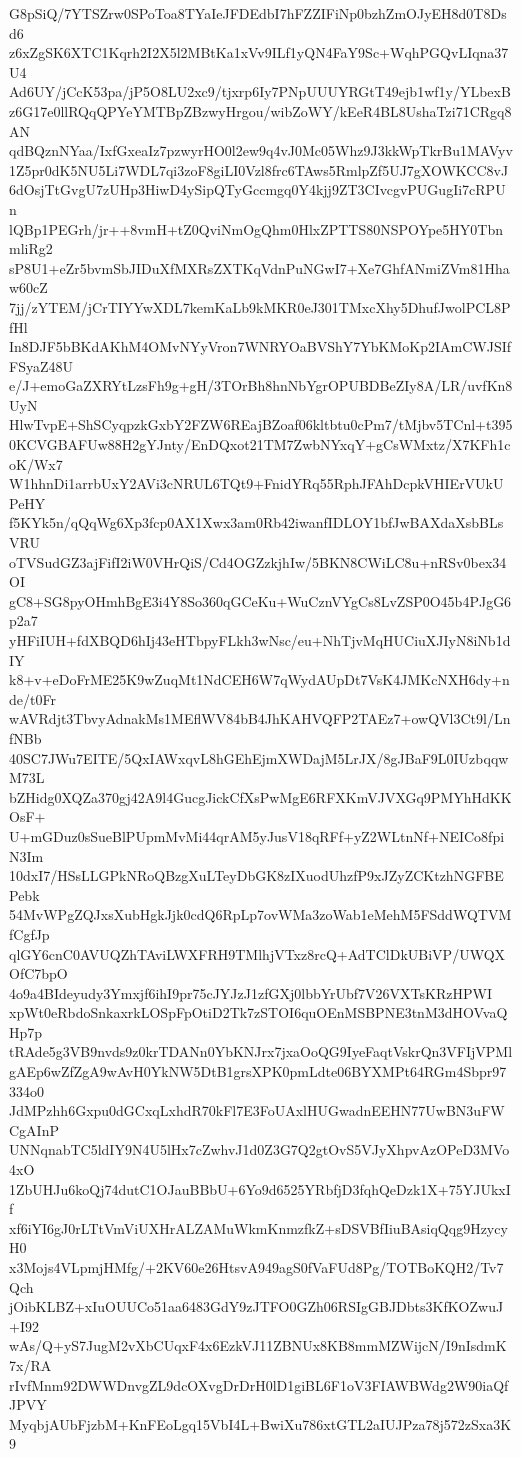 G8pSiQ/7YTSZrw0SPoToa8TYaIeJFDEdbI7hFZZIFiNp0bzhZmOJyEH8d0T8Dsd6
z6xZgSK6XTC1Kqrh2I2X5l2MBtKa1xVv9ILf1yQN4FaY9Sc+WqhPGQvLIqna37U4
Ad6UY/jCcK53pa/jP5O8LU2xc9/tjxrp6Iy7PNpUUUYRGtT49ejb1wf1y/YLbexB
z6G17e0llRQqQPYeYMTBpZBzwyHrgou/wibZoWY/kEeR4BL8UshaTzi71CRgq8AN
qdBQznNYaa/IxfGxeaIz7pzwyrHO0l2ew9q4vJ0Mc05Whz9J3kkWpTkrBu1MAVyv
1Z5pr0dK5NU5Li7WDL7qi3zoF8giLI0Vzl8frc6TAws5RmlpZf5UJ7gXOWKCC8vJ
6dOsjTtGvgU7zUHp3HiwD4ySipQTyGccmgq0Y4kjj9ZT3CIvcgvPUGugIi7cRPUn
lQBp1PEGrh/jr++8vmH+tZ0QviNmOgQhm0HlxZPTTS80NSPOYpe5HY0TbnmliRg2
sP8U1+eZr5bvmSbJIDuXfMXRsZXTKqVdnPuNGwI7+Xe7GhfANmiZVm81Hhaw60cZ
7jj/zYTEM/jCrTIYYwXDL7kemKaLb9kMKR0eJ301TMxcXhy5DhufJwolPCL8PfHl
In8DJF5bBKdAKhM4OMvNYyVron7WNRYOaBVShY7YbKMoKp2IAmCWJSIfFSyaZ48U
e/J+emoGaZXRYtLzsFh9g+gH/3TOrBh8hnNbYgrOPUBDBeZIy8A/LR/uvfKn8UyN
HlwTvpE+ShSCyqpzkGxbY2FZW6REajBZoaf06kltbtu0cPm7/tMjbv5TCnl+t395
0KCVGBAFUw88H2gYJnty/EnDQxot21TM7ZwbNYxqY+gCsWMxtz/X7KFh1coK/Wx7
W1hhnDi1arrbUxY2AVi3cNRUL6TQt9+FnidYRq55RphJFAhDcpkVHIErVUkUPeHY
f5KYk5n/qQqWg6Xp3fcp0AX1Xwx3am0Rb42iwanfIDLOY1bfJwBAXdaXsbBLsVRU
oTVSudGZ3ajFifI2iW0VHrQiS/Cd4OGZzkjhIw/5BKN8CWiLC8u+nRSv0bex34OI
gC8+SG8pyOHmhBgE3i4Y8So360qGCeKu+WuCznVYgCs8LvZSP0O45b4PJgG6p2a7
yHFiIUH+fdXBQD6hIj43eHTbpyFLkh3wNsc/eu+NhTjvMqHUCiuXJIyN8iNb1dIY
k8+v+eDoFrME25K9wZuqMt1NdCEH6W7qWydAUpDt7VsK4JMKcNXH6dy+nde/t0Fr
wAVRdjt3TbvyAdnakMs1MEflWV84bB4JhKAHVQFP2TAEz7+owQVl3Ct9l/LnfNBb
40SC7JWu7EITE/5QxIAWxqvL8hGEhEjmXWDajM5LrJX/8gJBaF9L0IUzbqqwM73L
bZHidg0XQZa370gj42A9l4GucgJickCfXsPwMgE6RFXKmVJVXGq9PMYhHdKKOsF+
U+mGDuz0sSueBlPUpmMvMi44qrAM5yJusV18qRFf+yZ2WLtnNf+NEICo8fpiN3Im
10dxI7/HSsLLGPkNRoQBzgXuLTeyDbGK8zIXuodUhzfP9xJZyZCKtzhNGFBEPebk
54MvWPgZQJxsXubHgkJjk0cdQ6RpLp7ovWMa3zoWab1eMehM5FSddWQTVMfCgfJp
qlGY6cnC0AVUQZhTAviLWXFRH9TMlhjVTxz8rcQ+AdTClDkUBiVP/UWQXOfC7bpO
4o9a4BIdeyudy3Ymxjf6ihI9pr75cJYJzJ1zfGXj0lbbYrUbf7V26VXTsKRzHPWI
xpWt0eRbdoSnkaxrkLOSpFpOtiD2Tk7zSTOI6quOEnMSBPNE3tnM3dHOVvaQHp7p
tRAde5g3VB9nvds9z0krTDANn0YbKNJrx7jxaOoQG9IyeFaqtVskrQn3VFIjVPMl
gAEp6wZfZgA9wAvH0YkNW5DtB1grsXPK0pmLdte06BYXMPt64RGm4Sbpr97334o0
JdMPzhh6Gxpu0dGCxqLxhdR70kFl7E3FoUAxlHUGwadnEEHN77UwBN3uFWCgAInP
UNNqnabTC5ldIY9N4U5lHx7cZwhvJ1d0Z3G7Q2gtOvS5VJyXhpvAzOPeD3MVo4xO
1ZbUHJu6koQj74dutC1OJauBBbU+6Yo9d6525YRbfjD3fqhQeDzk1X+75YJUkxIf
xf6iYI6gJ0rLTtVmViUXHrALZAMuWkmKnmzfkZ+sDSVBfIiuBAsiqQqg9HzycyH0
x3Mojs4VLpmjHMfg/+2KV60e26HtsvA949agS0fVaFUd8Pg/TOTBoKQH2/Tv7Qch
jOibKLBZ+xIuOUUCo51aa6483GdY9zJTFO0GZh06RSIgGBJDbts3KfKOZwuJ+I92
wAs/Q+yS7JugM2vXbCUqxF4x6EzkVJ11ZBNUx8KB8mmMZWijcN/I9nIsdmK7x/RA
rIvfMnm92DWWDnvgZL9dcOXvgDrDrH0lD1giBL6F1oV3FIAWBWdg2W90iaQfJPVY
MyqbjAUbFjzbM+KnFEoLgq15VbI4L+BwiXu786xtGTL2aIUJPza78j572zSxa3K9
